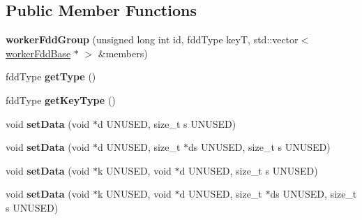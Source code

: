 \subsection*{Public Member Functions}
\begin{DoxyCompactItemize}
\item 
\hypertarget{classfaster_1_1workerFddGroup_a45283c070de15af37632439e38c09759}{}{\bfseries worker\+Fdd\+Group} (unsigned long int id, fdd\+Type key\+T, std\+::vector$<$ \hyperlink{classfaster_1_1workerFddBase}{worker\+Fdd\+Base} $\ast$ $>$ \&members)\label{classfaster_1_1workerFddGroup_a45283c070de15af37632439e38c09759}

\item 
\hypertarget{classfaster_1_1workerFddGroup_ae63a674f1aa32f94ad52c364923694b1}{}fdd\+Type {\bfseries get\+Type} ()\label{classfaster_1_1workerFddGroup_ae63a674f1aa32f94ad52c364923694b1}

\item 
\hypertarget{classfaster_1_1workerFddGroup_abc818de0a5d3dee42a947318171101e3}{}fdd\+Type {\bfseries get\+Key\+Type} ()\label{classfaster_1_1workerFddGroup_abc818de0a5d3dee42a947318171101e3}

\item 
\hypertarget{classfaster_1_1workerFddGroup_a6dbf3389af39d6a3bdf172a8cf38a476}{}void {\bfseries set\+Data} (void $\ast$d U\+N\+U\+S\+E\+D, size\+\_\+t s U\+N\+U\+S\+E\+D)\label{classfaster_1_1workerFddGroup_a6dbf3389af39d6a3bdf172a8cf38a476}

\item 
\hypertarget{classfaster_1_1workerFddGroup_ab2e537d9dd20658236084d1d97ded324}{}void {\bfseries set\+Data} (void $\ast$d U\+N\+U\+S\+E\+D, size\+\_\+t $\ast$ds U\+N\+U\+S\+E\+D, size\+\_\+t s U\+N\+U\+S\+E\+D)\label{classfaster_1_1workerFddGroup_ab2e537d9dd20658236084d1d97ded324}

\item 
\hypertarget{classfaster_1_1workerFddGroup_a40b698ad7823ceb2ffab2fd7dca1f7bd}{}void {\bfseries set\+Data} (void $\ast$k U\+N\+U\+S\+E\+D, void $\ast$d U\+N\+U\+S\+E\+D, size\+\_\+t s U\+N\+U\+S\+E\+D)\label{classfaster_1_1workerFddGroup_a40b698ad7823ceb2ffab2fd7dca1f7bd}

\item 
\hypertarget{classfaster_1_1workerFddGroup_abadd56f253ffbdaf46b38f6e3c2e708a}{}void {\bfseries set\+Data} (void $\ast$k U\+N\+U\+S\+E\+D, void $\ast$d U\+N\+U\+S\+E\+D, size\+\_\+t $\ast$ds U\+N\+U\+S\+E\+D, size\+\_\+t s U\+N\+U\+S\+E\+D)\label{classfaster_1_1workerFddGroup_abadd56f253ffbdaf46b38f6e3c2e708a}


\end{DoxyCompactItemize}
